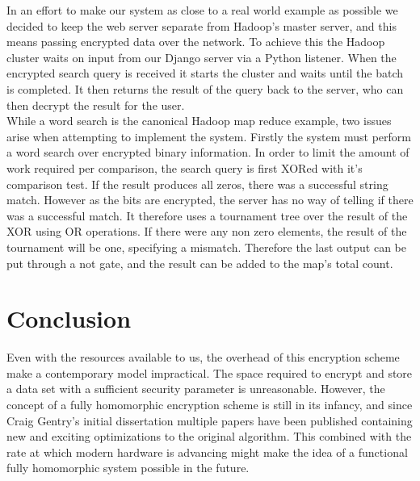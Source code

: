 \documentclass[letterpaper,11pt]{article} %
\begin{document}
In an effort to make our system as close to a real world example as possible we decided to keep the web server separate from Hadoop's master server, and this means passing encrypted data over the network. To achieve this the Hadoop cluster waits on input from our Django server via a Python listener. When the encrypted search query is received it starts the cluster and waits until the batch is completed. It then returns the result of the query back to the server, who can then decrypt the result for the user. \\

While a word search is the canonical Hadoop map reduce example, two issues arise when attempting to implement the system. Firstly the system must perform a word search over encrypted binary information. In order to limit the amount of work required per comparison, the search query is first XORed with it's comparison test. If the result produces all zeros, there was a successful string match. However as the bits are encrypted, the server has no way of telling if there was a successful match. It therefore uses a tournament tree over the result of the XOR using OR operations. If there were any non zero elements, the result of the tournament will be one, specifying a mismatch. Therefore the last output can be put through a not gate, and the result can be added to the map's total count. \\
\section*{Conclusion}

Even with the resources available to us, the overhead of this encryption scheme make a contemporary model impractical. The space required to encrypt and store a data set with a sufficient security parameter is unreasonable. However, the concept of a fully homomorphic encryption scheme is still in its infancy, and since Craig Gentry's initial dissertation multiple papers have been published containing new and exciting optimizations to the original algorithm. This combined with the rate at which modern hardware is advancing might make the idea of a functional fully homomorphic system possible in the future. 
\end{document}
